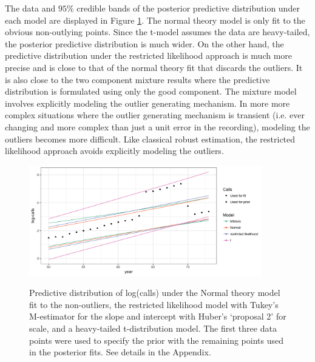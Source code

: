 \documentclass[ba]{imsart}
\begin{document}
The data and  $95\%$ credible bands of the posterior predictive distribution under each model are displayed in Figure \ref{fig:calls_predictive}. The normal theory model is only fit to the obvious non-outlying points. Since the t-model assumes the data are heavy-tailed, the posterior predictive distribution is much wider. On the other hand, the predictive distribution under the restricted likelihood approach is much more precise and is close to that of the normal theory fit that discards the outliers. It is also close to the two component mixture results where the predictive distribution is formulated using only the good component. The mixture model involves explicitly modeling the outlier generating mechanism. In more more complex situations where the outlier generating mechanism is transient (i.e. ever changing and more complex than just a unit error in the recording), modeling the outliers becomes more difficult. Like classical robust estimation, the restricted likelihood approach avoids explicitly modeling the outliers. 
\begin{figure}[t]
\centering
{\includegraphics[width = 4in]{figs/calls_predictive.png}}
\caption{Predictive distribution of log(calls) under the Normal theory model fit to the non-outliers, the restricted likelihood model with Tukey's M-estimator for the slope and intercept with Huber's `proposal 2'  for scale, and a heavy-tailed t-distribution model. The first three data points were used to specify the prior with the remaining points used in the posterior fits. See details in the Appendix.}
\label{fig:calls_predictive}
\end{figure}
\end{document}
